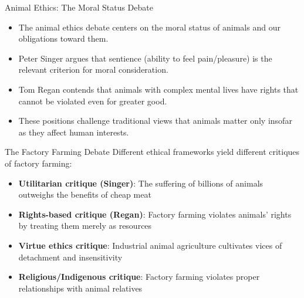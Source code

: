 \documentclass{beamer}
\begin{document}
	\begin{frame}{Animal Ethics: The Moral Status Debate}
		\begin{itemize}
			\item The animal ethics debate centers on the moral status of animals and our obligations toward them.
			\item Peter Singer argues that sentience (ability to feel pain/pleasure) is the relevant criterion for moral consideration.
			\item Tom Regan contends that animals with complex mental lives have rights that cannot be violated even for greater good.
			\item These positions challenge traditional views that animals matter only insofar as they affect human interests.
		\end{itemize}
		
		\begin{alertblock}{The Factory Farming Debate}
			\scriptsize
			Different ethical frameworks yield different critiques of factory farming:
			\begin{itemize}
				\item \textbf{Utilitarian critique (Singer)}: The suffering of billions of animals outweighs the benefits of cheap meat
				\item \textbf{Rights-based critique (Regan)}: Factory farming violates animals' rights by treating them merely as resources
				\item \textbf{Virtue ethics critique}: Industrial animal agriculture cultivates vices of detachment and insensitivity
				\item \textbf{Religious/Indigenous critique}: Factory farming violates proper relationships with animal relatives
			\end{itemize}
		\end{alertblock}
	\end{frame}
	
\end{document}
